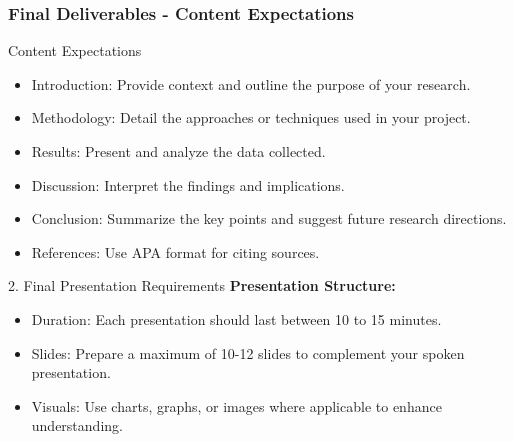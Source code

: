 \documentclass{beamer}
\begin{document}
\begin{frame}[fragile]
    \frametitle{Final Deliverables - Content Expectations}
    \begin{block}{Content Expectations}
        \begin{itemize}
            \item Introduction: Provide context and outline the purpose of your research.
            \item Methodology: Detail the approaches or techniques used in your project.
            \item Results: Present and analyze the data collected.
            \item Discussion: Interpret the findings and implications.
            \item Conclusion: Summarize the key points and suggest future research directions.
            \item References: Use APA format for citing sources.
        \end{itemize}
    \end{block}

    \begin{block}{2. Final Presentation Requirements}
        \textbf{Presentation Structure:}
        \begin{itemize}
            \item Duration: Each presentation should last between 10 to 15 minutes.
            \item Slides: Prepare a maximum of 10-12 slides to complement your spoken presentation.
            \item Visuals: Use charts, graphs, or images where applicable to enhance understanding.
        \end{itemize}
    \end{block}
\end{frame}
\end{document}
